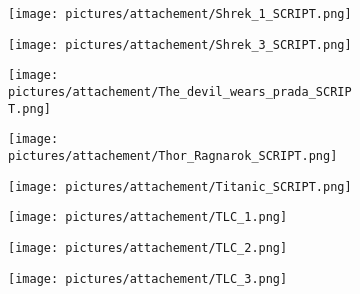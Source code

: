 \begin{figure} \ContinuedFloat
        \centering
        \begin{subfigure}{.49\textwidth}
                \centering
                \texttt{[image: pictures/attachement/Shrek\_1\_SCRIPT.png]}
        \end{subfigure}
        \begin{subfigure}{.49\textwidth}
                \centering
                \texttt{[image: pictures/attachement/Shrek\_3\_SCRIPT.png]}
        \end{subfigure}
\end{figure}
\begin{figure} \ContinuedFloat
        \centering
        \begin{subfigure}{.49\textwidth}
                \centering
                \texttt{[image: pictures/attachement/The\_devil\_wears\_prada\_SCRIPT.png]}
        \end{subfigure}
        \begin{subfigure}{.49\textwidth}
                \centering
                \texttt{[image: pictures/attachement/Thor\_Ragnarok\_SCRIPT.png]}
        \end{subfigure}
\end{figure}
\begin{figure} \ContinuedFloat
        \centering
        \begin{subfigure}{.49\textwidth}
                \centering
                \texttt{[image: pictures/attachement/Titanic\_SCRIPT.png]}
        \end{subfigure}
        \begin{subfigure}{.49\textwidth}
                \centering
                \texttt{[image: pictures/attachement/TLC\_1.png]}
        \end{subfigure}
\end{figure}
\begin{figure} \ContinuedFloat
        \centering
        \begin{subfigure}{.49\textwidth}
                \centering
                \texttt{[image: pictures/attachement/TLC\_2.png]}
        \end{subfigure}
        \begin{subfigure}{.49\textwidth}
                \centering
                \texttt{[image: pictures/attachement/TLC\_3.png]}
        \end{subfigure}
\end{figure}
